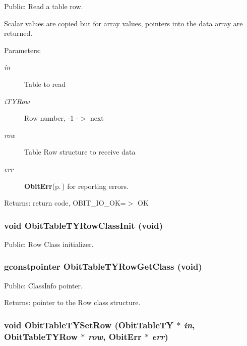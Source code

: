 Public: Read a table row. 

Scalar values are copied but for array values, pointers into the data array are returned. \begin{Desc}
\item[Parameters:]
\begin{description}
\item[{\em in}]Table to read \item[{\em i\-TYRow}]Row number, -1 -$>$ next \item[{\em row}]Table Row structure to receive data \item[{\em err}]{\bf Obit\-Err}{\rm (p.\,\pageref{structObitErr})} for reporting errors. \end{description}
\end{Desc}
\begin{Desc}
\item[Returns:]return code, OBIT\_\-IO\_\-OK=$>$ OK \end{Desc}
\subsubsection{\setlength{\rightskip}{0pt plus 5cm}void Obit\-Table\-TYRow\-Class\-Init (void)}\label{ObitTableTY_8h_a7}


Public: Row Class initializer. 

\subsubsection{\setlength{\rightskip}{0pt plus 5cm}gconstpointer Obit\-Table\-TYRow\-Get\-Class (void)}\label{ObitTableTY_8h_a9}


Public: Class\-Info pointer. 

\begin{Desc}
\item[Returns:]pointer to the Row class structure. \end{Desc}
\subsubsection{\setlength{\rightskip}{0pt plus 5cm}void Obit\-Table\-TYSet\-Row ({\bf Obit\-Table\-TY} $\ast$ {\em in}, {\bf Obit\-Table\-TYRow} $\ast$ {\em row}, {\bf Obit\-Err} $\ast$ {\em err})}\label{ObitTableTY_8h_a19}


